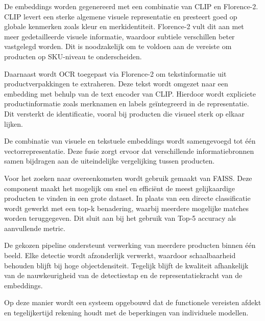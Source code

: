 De embeddings worden gegenereerd met een combinatie van CLIP en Florence-2. CLIP levert een sterke algemene visuele representatie en presteert goed op globale kenmerken zoals kleur en merkidentiteit. Florence-2 vult dit aan met meer gedetailleerde visuele informatie, waardoor subtiele verschillen beter vastgelegd worden. Dit is noodzakelijk om te voldoen aan de vereiste om producten op SKU-niveau te onderscheiden.

Daarnaast wordt OCR toegepast via Florence-2 om tekstinformatie uit productverpakkingen te extraheren. Deze tekst wordt omgezet naar een embedding met behulp van de text encoder van CLIP. Hierdoor wordt expliciete productinformatie zoals merknamen en labels geïntegreerd in de representatie. Dit versterkt de identificatie, vooral bij producten die visueel sterk op elkaar lijken.

De combinatie van visuele en tekstuele embeddings wordt samengevoegd tot één vectorrepresentatie. Deze fusie zorgt ervoor dat verschillende informatiebronnen samen bijdragen aan de uiteindelijke vergelijking tussen producten.

Voor het zoeken naar overeenkomsten wordt gebruik gemaakt van FAISS. Deze component maakt het mogelijk om snel en efficiënt de meest gelijkaardige producten te vinden in een grote dataset. In plaats van een directe classificatie wordt gewerkt met een top-k benadering, waarbij meerdere mogelijke matches worden teruggegeven. Dit sluit aan bij het gebruik van Top-5 accuracy als aanvullende metric.

De gekozen pipeline ondersteunt verwerking van meerdere producten binnen één beeld. Elke detectie wordt afzonderlijk verwerkt, waardoor schaalbaarheid behouden blijft bij hoge objectdensiteit. Tegelijk blijft de kwaliteit afhankelijk van de nauwkeurigheid van de detectiestap en de representatiekracht van de embeddings.

Op deze manier wordt een systeem opgebouwd dat de functionele vereisten afdekt en tegelijkertijd rekening houdt met de beperkingen van individuele modellen.